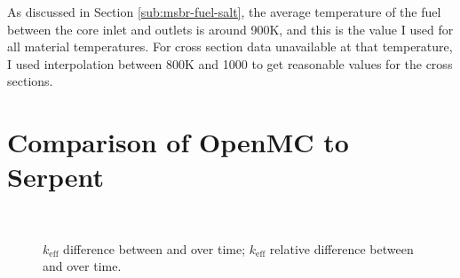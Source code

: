 As discussed in Section \ref{sub:msbr-fuel-salt}, the average temperature of the
fuel between the core inlet and outlets is around 900K, and this is the value I used
for all material temperatures. For cross section data
unavailable at that temperature, I used interpolation between 800K and 1000
to get reasonable values for the cross sections.

\section{Comparison of OpenMC to Serpent}
\label{sec:openmc-vs-serpent}

\begin{figure}[htpb]
    \centering
    \\
    \caption[$k_\text{eff}$ difference between \OpenMC and \SerpentTWO over time]{
         $k_\text{eff}$ difference between \OpenMC and \SerpentTWO over time;
         $k_\text{eff}$ relative difference between \OpenMC and \SerpentTWO 
        over time.
    }
    \label{fig:keff_sum}
\end{figure}


